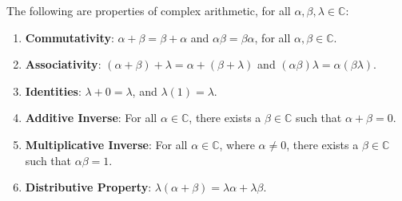 \documentclass[openany]{book}
\newcommand{\CC}{\mathbb{C}}
\begin{document}
\begin{thm}\label{Thm: Complex Arithmetic}
	The following are properties of complex arithmetic, for all $\alpha, \beta, \lambda \in \CC$:
	
	\begin{enumerate}
		\item \textbf{Commutativity}: $\alpha + \beta = \beta + \alpha$ and $\alpha\beta = \beta\alpha$, for all $\alpha, \beta \in \CC$.
		
		\item \textbf{Associativity}: $(\alpha + \beta) + \lambda = \alpha + (\beta + \lambda)$ and $(\alpha\beta)\lambda = \alpha(\beta\lambda)$.
		
		\item \textbf{Identities}: $\lambda + 0 = \lambda$, and $\lambda(1) = \lambda$.
		
		\item \textbf{Additive Inverse}: For all $\alpha \in \CC$, there exists a $\beta \in \CC$ such that $\alpha + \beta = 0$.
		
		\item \textbf{Multiplicative Inverse}: For all $\alpha \in \CC$, where $\alpha \not= 0$, there exists a $\beta \in \CC$ such that $\alpha\beta = 1$.
		
		\item \textbf{Distributive Property}: $\lambda(\alpha + \beta) = \lambda\alpha + \lambda\beta$.
	\end{enumerate}
\end{thm}
\end{document}

